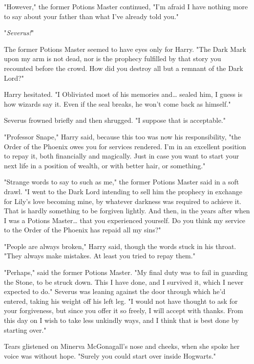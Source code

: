 "However," the former Potions Master continued, "I'm afraid I have nothing more
to say about your father than what I've already told you."

"\emph{Severus!}"

The former Potions Master seemed to have eyes only for Harry. "The Dark Mark
upon my arm is not dead, nor is the prophecy fulfilled by that story you
recounted before the crowd. How did you destroy all but a remnant of the Dark
Lord?"

Harry hesitated. "I Obliviated most of his memories and{\ldots} sealed him, I
guess is how wizards say it. Even if the seal breaks, he won't come back as
himself."

Severus frowned briefly and then shrugged. "I suppose that is acceptable."

"Professor Snape," Harry said, because this too was now his responsibility,
"the Order of the Phoenix owes you for services rendered. I'm in an excellent
position to repay it, both financially and magically. Just in case you want to
start your next life in a position of wealth, or with better hair, or
something."

"Strange words to say to such as me," the former Potions Master said in a soft
drawl. "I went to the Dark Lord intending to sell him the prophecy in exchange
for Lily's love becoming mine, by whatever darkness was required to achieve it.
That is hardly something to be forgiven lightly. And then, in the years after
when I was a Potions Master{\ldots} that you experienced yourself. Do you think
my service to the Order of the Phoenix has repaid all my sins?"

"People are always broken," Harry said, though the words stuck in his throat.
"They always make mistakes. At least you tried to repay them."

"Perhaps," said the former Potions Master. "My final duty was to fail in
guarding the Stone, to be struck down. This I have done, and I survived it,
which I never expected to do." Severus was leaning against the door through
which he'd entered, taking his weight off his left leg. "I would not have
thought to ask for your forgiveness, but since you offer it so freely, I will
accept with thanks. From this day on I wish to take less unkindly ways, and I
think that is best done by starting over."

Tears glistened on Minerva McGonagall's nose and cheeks, when she spoke her
voice was without hope. "Surely you could start over inside Hogwarts."

